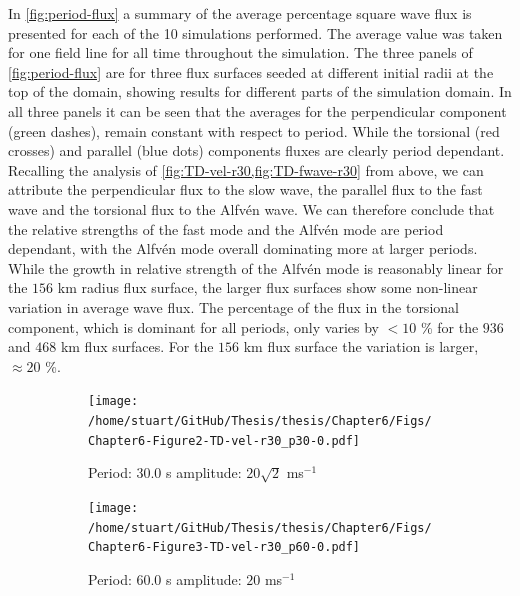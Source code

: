 \documentclass[a4paper,12pt,fourier,authoryear,custommargin]{Classes/PhDThesisPSnPDF}
\begin{document}
In \cref{fig:period-flux} a summary of the average percentage square wave flux is presented for each of the 10
simulations performed.
The average value was taken for one field line for all time throughout the simulation.
The three panels of \cref{fig:period-flux} are for three flux surfaces seeded at different initial radii at the top of the domain, showing results for different parts of the simulation domain.
In all three panels it can be seen that the averages for the perpendicular component (green dashes), remain constant with respect to period.
While the torsional (red crosses) and parallel (blue dots) components fluxes are clearly period dependant.
Recalling the analysis of \cref{fig:TD-vel-r30,fig:TD-fwave-r30} from above, we can attribute the perpendicular flux to the slow wave, the parallel flux to the fast wave and the torsional flux to the Alfv\'en wave.
We can therefore conclude that the relative strengths of the fast mode and the Alfv\'en mode are period dependant, with the Alfv\'en mode overall dominating more at larger periods.
While the growth in relative strength of the Alfv\'en mode is reasonably linear for the $156$ km radius flux surface, the larger flux surfaces show some non-linear variation in average wave flux. 
The percentage of the flux in the torsional component, which is dominant for all periods, only varies by $<10$ \% for the $936$ and $468$ km flux surfaces.
For the $156$ km flux surface the variation is larger, $\approx 20$ \%.



\begin{figure}
    \centering
    

    \begin{subfigure}[b]{0.79\columnwidth}
        \texttt{[image: /home/stuart/GitHub/Thesis/thesis/Chapter6/Figs/Chapter6-Figure2-TD-vel-r30\_p30-0.pdf]}
        \caption{Period: $30.0$ s amplitude: $20\sqrt{2}$ ms$^{{-1}}$}
        \label{fig:TD-vel-r30-p30-0}
    \end{subfigure}

    \begin{subfigure}[b]{0.79\columnwidth}
        \texttt{[image: /home/stuart/GitHub/Thesis/thesis/Chapter6/Figs/Chapter6-Figure3-TD-vel-r30\_p60-0.pdf]}
        \caption{Period: $60.0$ s amplitude: $20$ ms$^{{-1}}$}
        \label{fig:TD-vel-r30-p60-0}
    \end{subfigure}
    \caption{}
    \label{fig:TD-vel-r30}
\end{figure}
\end{document}

